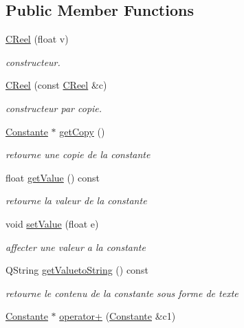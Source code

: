 \subsection*{Public Member Functions}
\begin{DoxyCompactItemize}
\item 
\hyperlink{class_c_reel_a48315083e4113820ea0c0b52b428b4cb}{C\-Reel} (float v)
\begin{DoxyCompactList}\small\item\em constructeur. \end{DoxyCompactList}\item 
\hyperlink{class_c_reel_a40477248c55c086f5f5b19bfdf4b953c}{C\-Reel} (const \hyperlink{class_c_reel}{C\-Reel} \&c)
\begin{DoxyCompactList}\small\item\em constructeur par copie. \end{DoxyCompactList}\item 
\hyperlink{class_constante}{Constante} $\ast$ \hyperlink{class_c_reel_a7971d82193e3305f266f69547cad8bb7}{get\-Copy} ()
\begin{DoxyCompactList}\small\item\em retourne une copie de la constante \end{DoxyCompactList}\item 
float \hyperlink{class_c_reel_add5e970521e6e7dd6f3374af69826062}{get\-Value} () const 
\begin{DoxyCompactList}\small\item\em retourne la valeur de la constante \end{DoxyCompactList}\item 
void \hyperlink{class_c_reel_ace93771b191f173c66a35ed8ca9f8f61}{set\-Value} (float e)
\begin{DoxyCompactList}\small\item\em affecter une valeur a la constante \end{DoxyCompactList}\item 
Q\-String \hyperlink{class_c_reel_a4f8123c4f5659383d05ead9d02b221ec}{get\-Valueto\-String} () const 
\begin{DoxyCompactList}\small\item\em retourne le contenu de la constante sous forme de texte \end{DoxyCompactList}\item 
\hyperlink{class_constante}{Constante} $\ast$ \hyperlink{class_c_reel_a61a8eb92280d208f9fffa699f9be989f}{operator+} (\hyperlink{class_constante}{Constante} \&c1)

\end{DoxyCompactItemize}
